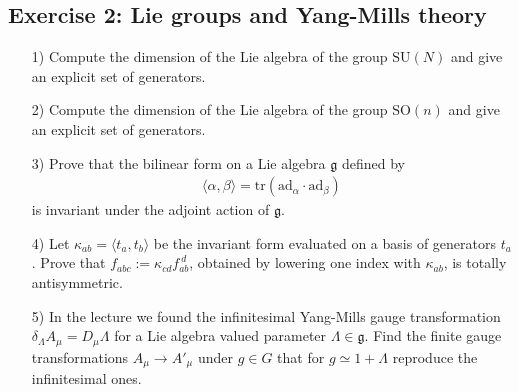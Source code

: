 \documentclass[10pt,a4paper]{article}
\theoremstyle{definition}
\begin{document}
\subsection{Exercise 2: Lie groups and Yang-Mills theory}
{\color{blue} 
\begin{enumerate}
\item[1)] Compute the dimension of the Lie algebra of the group $\mathrm{SU}(N)$ and give an explicit set of generators.
\item[2)] Compute the dimension of the Lie algebra of the group $\mathrm{SO}(n)$ and give an explicit set of generators.
\item[3)] Prove that the bilinear form on a Lie algebra $\mathfrak{g}$ defined by
\begin{align}
\langle \alpha, \beta \rangle = \mathrm{tr}(\mathrm{ad}_\alpha \cdot \mathrm{ad}_\beta)
\end{align}
is invariant under the adjoint action of $\mathfrak{g}$.
\item[4)] Let $\kappa_{ab} = \langle t_a, t_b \rangle$ be the invariant form evaluated on a basis of generators $t_a$. Prove that $f_{abc} := \kappa_{cd} f_{ab}^{\ d}$, obtained by lowering one index with $\kappa_{ab}$, is totally antisymmetric.
\item[5)] In the lecture we found the infinitesimal Yang-Mills gauge transformation $\delta_\Lambda A_\mu = D_\mu \Lambda$ for a Lie algebra valued parameter $\Lambda \in \mathfrak{g}$. Find the finite gauge transformations $A_\mu \rightarrow A'_\mu$ under $g \in G$ that for $g \simeq 1 + \Lambda$ reproduce the infinitesimal ones.
\end{enumerate}
}
\end{document}
